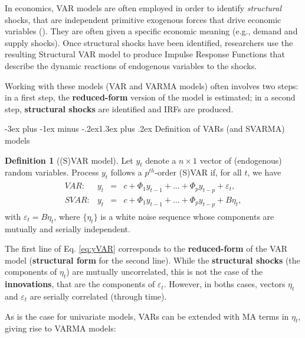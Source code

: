 \documentclass[
  11pt,
]{book}
\makeatletter
\renewcommand\section{\@startsection{section}{1}{\z@}
  {-3ex plus -1ex minus -.2ex}{1.3ex plus .2ex}
  {\normalfont\Large\bfseries\color{TextbookInk}}}
\theoremstyle{definition}
\newtheorem{definition}{Definition}[chapter]
\theoremstyle{definition}
\theoremstyle{definition}
\theoremstyle{definition}
\theoremstyle{remark}
\makeatother
\begin{document}
In economics, VAR models are often employed in order to identify \emph{structural} shocks, that are independent primitive exogenous forces that drive economic variables (\citet{Ramey_2016_NBER}). They are often given a specific economic meaning (e.g., demand and supply shocks). Once structural shocks have been identified, researchers use the resulting Structural VAR model to produce Impulse Response Functions that describe the dynamic reactions of endogenous variables to the shocks.

Working with these models (VAR and VARMA models) often involves two steps: in a first step, the \textbf{reduced-form} version of the model is estimated; in a second step, \textbf{structural shocks} are identified and IRFs are produced.

\section{Definition of VARs (and SVARMA) models}\label{definition-of-vars-and-svarma-models}

\begin{definition}[(S)VAR model]
\protect\hypertarget{def:SVAR}{}\label{def:SVAR}Let \(y_{t}\) denote a \(n \times1\) vector of (endogenous) random variables. Process \(y_{t}\) follows a \(p^{th}\)-order (S)VAR if, for all \(t\), we have
\begin{eqnarray}
\begin{array}{rllll}
VAR:& y_t &=& c + \Phi_1 y_{t-1} + \dots + \Phi_p y_{t-p} + \varepsilon_t,\\
SVAR:& y_t &=& c + \Phi_1 y_{t-1} + \dots + \Phi_p y_{t-p} + B \eta_t,
\end{array}\label{eq:yVAR}
\end{eqnarray}
with \(\varepsilon_t = B\eta_t\), where \(\{\eta_{t}\}\) is a white noise sequence whose components are mutually and serially independent.
\end{definition}

The first line of Eq. \eqref{eq:yVAR} corresponds to the \textbf{reduced-form} of the VAR model (\textbf{structural form} for the second line). While the \textbf{structural shocks} (the components of \(\eta_t\)) are mutually uncorrelated, this is not the case of the \textbf{innovations}, that are the components of \(\varepsilon_t\). However, in boths cases, vectors \(\eta_t\) and \(\varepsilon_t\) are serially correlated (through time).

As is the case for univariate models, VARs can be extended with MA terms in \(\eta_t\), giving rise to VARMA models:
\end{document}
